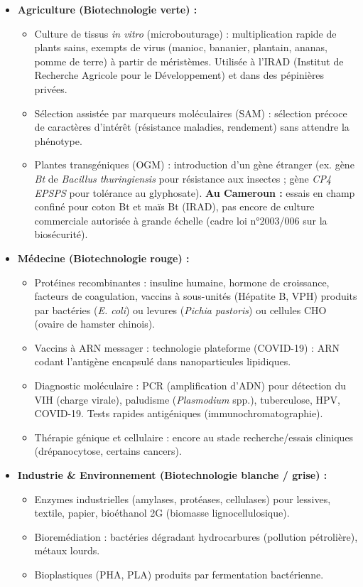 \documentclass[11pt]{article}
\newcommand{\cle}[1]{{\popxbold\color{popdark}#1}}
\begin{document}
\begin{aretenir}
\begin{itemize}
\item \textbf{Agriculture (Biotechnologie verte) :}
  \begin{itemize}
  \item \cle{Culture de tissus \emph{in vitro} (microbouturage) :} multiplication rapide de plants sains, exempts de virus (manioc, bananier, plantain, ananas, pomme de terre) à partir de méristèmes. Utilisée à l'IRAD (Institut de Recherche Agricole pour le Développement) et dans des pépinières privées.
  \item \cle{Sélection assistée par marqueurs moléculaires (SAM) :} sélection précoce de caractères d'intérêt (résistance maladies, rendement) sans attendre la phénotype.
  \item \cle{Plantes transgéniques (OGM) :} introduction d'un gène étranger (ex. gène \emph{Bt} de \emph{Bacillus thuringiensis} pour résistance aux insectes ; gène \emph{CP4 EPSPS} pour tolérance au glyphosate). \textbf{Au Cameroun :} essais en champ confiné pour coton Bt et maïs Bt (IRAD), pas encore de culture commerciale autorisée à grande échelle (cadre loi n°2003/006 sur la biosécurité).
  \end{itemize}
\item \textbf{Médecine (Biotechnologie rouge) :}
  \begin{itemize}
  \item \cle{Protéines recombinantes :} insuline humaine, hormone de croissance, facteurs de coagulation, vaccins à sous-unités (Hépatite B, VPH) produits par bactéries (\emph{E. coli}) ou levures (\emph{Pichia pastoris}) ou cellules CHO (ovaire de hamster chinois).
  \item \cle{Vaccins à ARN messager :} technologie plateforme (COVID-19) : ARN codant l'antigène encapsulé dans nanoparticules lipidiques.
  \item \cle{Diagnostic moléculaire :} PCR (amplification d'ADN) pour détection du VIH (charge virale), paludisme (\emph{Plasmodium} spp.), tuberculose, HPV, COVID-19. Tests rapides antigéniques (immunochromatographie).
  \item \cle{Thérapie génique et cellulaire :} encore au stade recherche/essais cliniques (drépanocytose, certains cancers).
  \end{itemize}
\item \textbf{Industrie \& Environnement (Biotechnologie blanche / grise) :}
  \begin{itemize}
  \item Enzymes industrielles (amylases, protéases, cellulases) pour lessives, textile, papier, bioéthanol 2G (biomasse lignocellulosique).
  \item Bioremédiation : bactéries dégradant hydrocarbures (pollution pétrolière), métaux lourds.
  \item Bioplastiques (PHA, PLA) produits par fermentation bactérienne.
  \end{itemize}
\end{itemize}
\end{aretenir}
\end{document}
